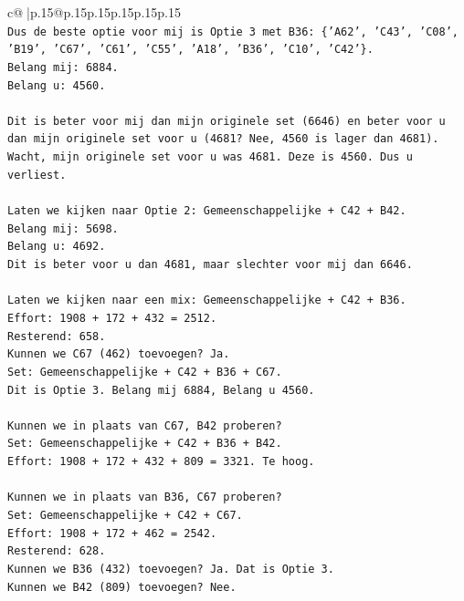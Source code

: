 \documentclass{article}
\begin{document}
{\begin{supertabular}{c@{$\;$}|p{.15\linewidth}@{}p{.15\linewidth}p{.15\linewidth}p{.15\linewidth}p{.15\linewidth}p{.15\linewidth}}
{{{\\ 
\texttt{Dus de beste optie voor mij is Optie 3 met B36: \{'A62', 'C43', 'C08', 'B19', 'C67', 'C61', 'C55', 'A18', 'B36', 'C10', 'C42'\}.} \\
\texttt{Belang mij: 6884.} \\
\texttt{Belang u: 4560.} \\
\\ 
\texttt{Dit is beter voor mij dan mijn originele set (6646) en beter voor u dan mijn originele set voor u (4681? Nee, 4560 is lager dan 4681).} \\
\texttt{Wacht, mijn originele set voor u was 4681. Deze is 4560. Dus u verliest.} \\
\\ 
\texttt{Laten we kijken naar Optie 2: Gemeenschappelijke + C42 + B42.} \\
\texttt{Belang mij: 5698.} \\
\texttt{Belang u: 4692.} \\
\texttt{Dit is beter voor u dan 4681, maar slechter voor mij dan 6646.} \\
\\ 
\texttt{Laten we kijken naar een mix: Gemeenschappelijke + C42 + B36.} \\
\texttt{Effort: 1908 + 172 + 432 = 2512.} \\
\texttt{Resterend: 658.} \\
\texttt{Kunnen we C67 (462) toevoegen? Ja.} \\
\texttt{Set: Gemeenschappelijke + C42 + B36 + C67.} \\
\texttt{Dit is Optie 3. Belang mij 6884, Belang u 4560.} \\
\\ 
\texttt{Kunnen we in plaats van C67, B42 proberen?} \\
\texttt{Set: Gemeenschappelijke + C42 + B36 + B42.} \\
\texttt{Effort: 1908 + 172 + 432 + 809 = 3321. Te hoog.} \\
\\ 
\texttt{Kunnen we in plaats van B36, C67 proberen?} \\
\texttt{Set: Gemeenschappelijke + C42 + C67.} \\
\texttt{Effort: 1908 + 172 + 462 = 2542.} \\
\texttt{Resterend: 628.} \\
\texttt{Kunnen we B36 (432) toevoegen? Ja. Dat is Optie 3.} \\
\texttt{Kunnen we B42 (809) toevoegen? Nee.} \\
}}}
\end{supertabular}}
\end{document}

